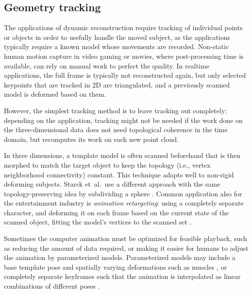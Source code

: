 \subsection{Geometry tracking} %

The applications of dynamic reconstruction require tracking of individual points or objects in order to usefully handle the moved subject, as the applications typically require a known model whose movements are recorded.
Non-static human motion capture in video gaming or movies, where post-processing time is available, can rely on manual work to perfect the quality.
In realtime applications, the full frame is typically not reconstructed again, but only selected keypoints that are tracked in 2D are triangulated, and a previously scanned model is deformed based on them.

However, the simplest tracking method is to leave tracking out completely: depending on the application, tracking might not be needed if the work done on the three-dimensional data does not need topological coherence in the time domain, but recomputes its work on each new point cloud.


In three dimensions, a template model is often scanned beforehand that is then morphed to match the target object to keep the topology (i.e., vertex neighborhood connectivity) constant.
This technique adapts well to non-rigid deforming subjects. \cite{bojsen2012tracking,li2009robust}
Starck et~al.\ use a different approach with the same topology-preserving idea by subdividing a sphere \cite{starck2007surface}.
Common application also for the entertainment industry is \emph{animation retargeting}: using a completely separate character, and deforming it on each frame based on the current state of the scanned object, fitting the model's vertices to the scanned set \cite{sumner2004deformation}.

Sometimes the computer animation must be optimized for feasible playback, such as reducing the amount of data required, or making it easier for humans to adjust the animation by parameterized models.
Parameterized models may include a base template pose and spatially varying deformations such as muscles \cite{waters1987muscle}, or completely separate keyframes such that the animation is interpolated as linear combinations of different poses \cite{deng2007computer,beeler2011high}.


